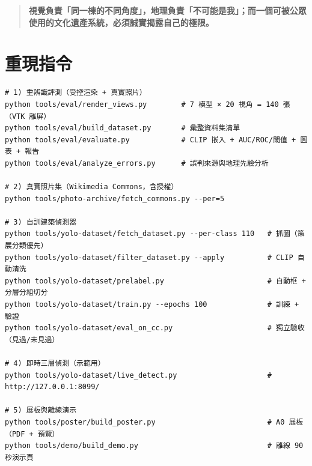 \documentclass[11pt,a4paper,fontset=windows]{ctexart}
\begin{document}
\begin{quote}
\textbf{視覺負責「同一棟的不同角度」，地理負責「不可能是我」；而一個可被公眾使用的文化遺產系統，必須誠實揭露自己的極限。}
\end{quote}

\appendix

\section{重現指令}
\begin{verbatim}
# 1) 重辨識評測（受控渲染 + 真實照片）
python tools/eval/render_views.py        # 7 模型 × 20 視角 = 140 張（VTK 離屏）
python tools/eval/build_dataset.py       # 彙整資料集清單
python tools/eval/evaluate.py            # CLIP 嵌入 + AUC/ROC/閾值 + 圖表 + 報告
python tools/eval/analyze_errors.py      # 誤判來源與地理先驗分析

# 2) 真實照片集（Wikimedia Commons，含授權）
python tools/photo-archive/fetch_commons.py --per=5

# 3) 自訓建築偵測器
python tools/yolo-dataset/fetch_dataset.py --per-class 110   # 抓圖（策展分類優先）
python tools/yolo-dataset/filter_dataset.py --apply          # CLIP 自動清洗
python tools/yolo-dataset/prelabel.py                        # 自動框 + 分層分組切分
python tools/yolo-dataset/train.py --epochs 100              # 訓練 + 驗證
python tools/yolo-dataset/eval_on_cc.py                      # 獨立驗收（見過/未見過）

# 4) 即時三層偵測（示範用）
python tools/yolo-dataset/live_detect.py                     # http://127.0.0.1:8099/

# 5) 展板與離線演示
python tools/poster/build_poster.py                          # A0 展板（PDF + 預覽）
python tools/demo/build_demo.py                              # 離線 90 秒演示頁
\end{verbatim}

\end{document}
